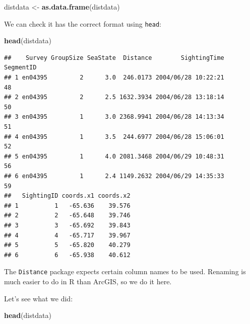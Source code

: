 \documentclass[]{book}
\newenvironment{Shaded}{\begin{snugshade}}{\end{snugshade}}
\newcommand{\KeywordTok}[1]{\textcolor[rgb]{0.13,0.29,0.53}{\textbf{#1}}}
\newcommand{\StringTok}[1]{\textcolor[rgb]{0.31,0.60,0.02}{#1}}
\newcommand{\OperatorTok}[1]{\textcolor[rgb]{0.81,0.36,0.00}{\textbf{#1}}}
\newcommand{\NormalTok}[1]{#1}
\theoremstyle{definition}
\theoremstyle{definition}
\theoremstyle{remark}
\begin{document}
\begin{Shaded}
\begin{Highlighting}[]
\NormalTok{distdata <-}\StringTok{ }\KeywordTok{as.data.frame}\NormalTok{(distdata)}
\end{Highlighting}
\end{Shaded}

We can check it has the correct format using \texttt{head}:

\begin{Shaded}
\begin{Highlighting}[]
\KeywordTok{head}\NormalTok{(distdata)}
\end{Highlighting}
\end{Shaded}

\begin{verbatim}
##    Survey GroupSize SeaState  Distance        SightingTime SegmentID
## 1 en04395         2      3.0  246.0173 2004/06/28 10:22:21        48
## 2 en04395         2      2.5 1632.3934 2004/06/28 13:18:14        50
## 3 en04395         1      3.0 2368.9941 2004/06/28 14:13:34        51
## 4 en04395         1      3.5  244.6977 2004/06/28 15:06:01        52
## 5 en04395         1      4.0 2081.3468 2004/06/29 10:48:31        56
## 6 en04395         1      2.4 1149.2632 2004/06/29 14:35:33        59
##   SightingID coords.x1 coords.x2
## 1          1   -65.636    39.576
## 2          2   -65.648    39.746
## 3          3   -65.692    39.843
## 4          4   -65.717    39.967
## 5          5   -65.820    40.279
## 6          6   -65.938    40.612
\end{verbatim}

The \texttt{Distance} package expects certain column names to be used.
Renaming is much easier to do in R than ArcGIS, so we do it here.

\begin{Shaded}
\end{Shaded}

Let's see what we did:

\begin{Shaded}
\begin{Highlighting}[]
\KeywordTok{head}\NormalTok{(distdata)}
\end{Highlighting}
\end{Shaded}
\end{document}
